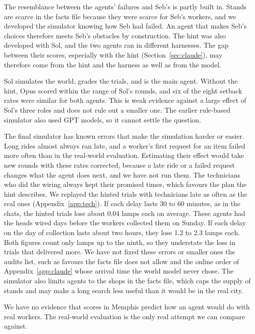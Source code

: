\documentclass[10pt]{article}
\begin{document}
The resemblance between the agents' failures and Seb's is partly built in. Stands are scarce in the facts file because they were scarce for Seb's workers, and we developed the simulator knowing how Seb had failed. An agent that makes Seb's choices therefore meets Seb's obstacles by construction. The hint was also developed with Sol, and the two agents ran in different harnesses. The gap between their scores, especially with the hint (Section~\ref{sec:claude}), may therefore come from the hint and the harness as well as from the model.

Sol simulates the world, grades the trials, and is the main agent. Without the hint, Opus scored within the range of Sol's rounds, and six of the eight setback rates were similar for both agents. This is weak evidence against a large effect of Sol's three roles and does not rule out a smaller one. The earlier rule-based simulator also used GPT models, so it cannot settle the question.

The final simulator has known errors that make the simulation harder or easier. Long rides almost always ran late, and a worker's first request for an item failed more often than in the real-world evaluation. Estimating their effect would take new rounds with these rates corrected, because a late ride or a failed request changes what the agent does next, and we have not run them. The technicians who did the wiring always kept their promised times, which favours the plan the hint describes. We replayed the hinted trials with technicians late as often as the real ones (Appendix~\ref{app:tech}). If each delay lasts 30 to 60 minutes, as in the chats, the hinted trials lose about 0.04 lamps each on average. These agents had the heads wired days before the workers collected them on Sunday. If each delay on the day of collection lasts about two hours, they lose 1.2 to 2.3 lamps each. Both figures count only lamps up to the ninth, so they understate the loss in trials that delivered more. We have not fixed these errors or smaller ones the audits list, such as favours the facts file does not allow and the online order of Appendix~\ref{app:claude} whose arrival time the world model never chose. The simulator also limits agents to the shops in the facts file, which caps the supply of stands and may make a long search less useful than it would be in the real city.

We have no evidence that scores in Memphis predict how an agent would do with real workers. The real-world evaluation is the only real attempt we can compare against.
\end{document}
